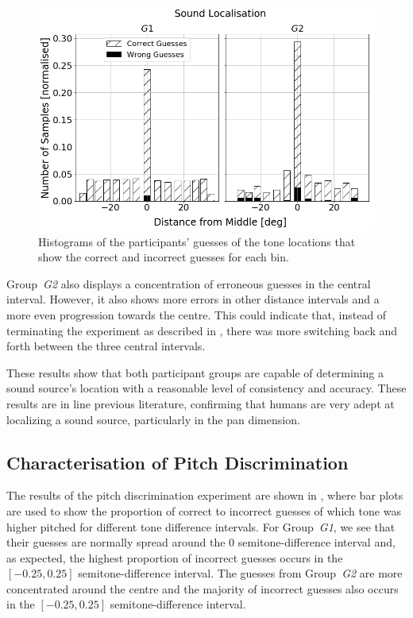\documentclass[acmsmall]{acmart}
\begin{document}
\begin{figure}
  \centering
  \includegraphics[width=0.8\columnwidth]{figures/sound_localisation.png}
  \caption{Histograms of the participants' guesses of the tone locations that show the correct and incorrect guesses for each bin. }\label{fig:sound-localisation}
\end{figure}

Group~\textit{G2} also displays a concentration of erroneous guesses in the central interval.
However, it also shows more errors in other distance intervals and a more even progression towards the centre.
This could indicate that, instead of terminating the experiment as described in , there was more switching back and forth between the three central intervals. 

These results show that both participant groups are capable of determining a sound source's location with a reasonable level of consistency and accuracy.
These results are in line previous literature, confirming that humans are very adept at localizing a sound source, particularly in the pan dimension. 

\subsection{Characterisation of Pitch Discrimination}

The results of the pitch discrimination experiment are shown in , where bar plots are used to show the proportion of correct to incorrect guesses of which tone was higher pitched for different tone difference intervals. 
For Group~\textit{G1}, we see that their guesses are normally spread around the 0 semitone-difference interval and, as expected, the highest proportion of incorrect guesses occurs in the $[-0.25, 0.25]$ semitone-difference interval. 
The guesses from Group~\textit{G2} are more concentrated around the centre and the majority of incorrect guesses also occurs in the $[-0.25, 0.25]$ semitone-difference interval.
\end{document}
